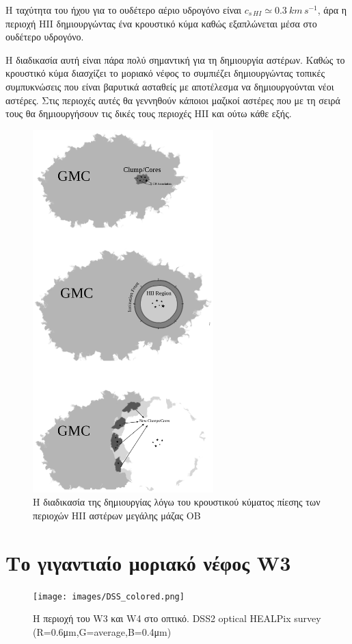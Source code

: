 \documentclass[a4paper,12pt]{memoir}
\begin{document}
Η ταχύτητα του ήχου για το ουδέτερο αέριο υδρογόνο είναι $c_{s \, HI}\simeq 0.3 \ km \, s^{-1}$, άρα η περιοχή HII δημιουργώντας ένα κρουστικό κύμα καθώς εξαπλώνεται μέσα στο ουδέτερο υδρογόνο. 

Η διαδικασία αυτή είναι πάρα πολύ σημαντική για τη δημιουργία αστέρων. Καθώς το κρουστικό κύμα διασχίζει το μοριακό νέφος το συμπιέζει δημιουργώντας τοπικές συμπυκνώσεις που είναι βαρυτικά ασταθείς με αποτέλεσμα να δημιουργούνται νέοι αστέρες. Στις περιοχές αυτές θα γεννηθούν κάποιοι μαζικοί αστέρες που με τη σειρά τους θα δημιουργήσουν τις δικές τους περιοχές HII και ούτω κάθε εξής.


\begin{figure}[h]
	\centering
	\includegraphics[height=14cm]{images/induced.ps}
	\caption{Η διαδικασία της δημιουργίας λόγω του κρουστικού κύματος πίεσης των περιοχών HII αστέρων μεγάλης μάζας OB}
\end{figure}


\chapter{Το γιγαντιαίο μοριακό νέφος W3}

\begin{figure}[h]
	\centering
	\texttt{[image: images/DSS\_colored.png]}
	\caption{Η περιοχή του W3 και W4 στο οπτικό. DSS2 optical HEALPix survey (R=0.6μm,G=average,B=0.4μm)}
\end{figure}
\end{document}
